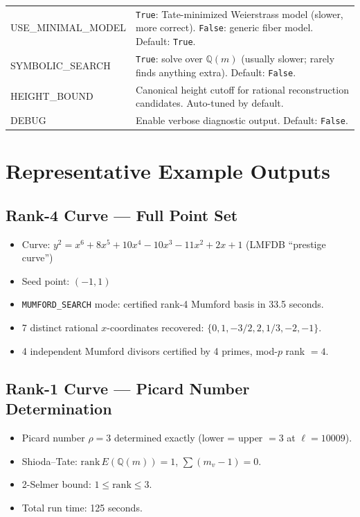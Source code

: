 \documentclass[11pt, a4paper]{article}
\begin{document}
\begin{table}[h]
\begin{tabularx}{\textwidth}{l X}
        USE\_MINIMAL\_MODEL & \texttt{True}: Tate-minimized Weierstrass model (slower, more correct). \texttt{False}: generic fiber model. Default: \texttt{True}. \\
        SYMBOLIC\_SEARCH & \texttt{True}: solve over $\mathbb{Q}(m)$ (usually slower; rarely finds anything extra). Default: \texttt{False}. \\
        HEIGHT\_BOUND & Canonical height cutoff for rational reconstruction candidates. Auto-tuned by default. \\
        DEBUG & Enable verbose diagnostic output. Default: \texttt{False}. \\
        \bottomrule
    \end{tabularx}
\end{table}

\section{Representative Example Outputs}

\subsection{Rank-4 Curve — Full Point Set}

\begin{itemize}[label={\textbullet}]
    \item Curve: $y^2 = x^6 + 8x^5 + 10x^4 - 10x^3 - 11x^2 + 2x + 1$ (LMFDB ``prestige curve'')
    \item Seed point: $(-1, 1)$
    \item \texttt{MUMFORD\_SEARCH} mode: certified rank-4 Mumford basis in 33.5 seconds.
    \item 7 distinct rational $x$-coordinates recovered: $\{0, 1, -3/2, 2, 1/3, -2, -1\}$.
    \item 4 independent Mumford divisors certified by 4 primes, mod-$p$ rank $= 4$.
\end{itemize}

\subsection{Rank-1 Curve — Picard Number Determination}

\begin{itemize}[label={\textbullet}]
    \item Picard number $\rho = 3$ determined exactly (lower = upper $= 3$ at $\ell = 10009$).
    \item Shioda--Tate: $\text{rank}\, E(\mathbb{Q}(m)) = 1$, $\sum (m_v - 1) = 0$.
    \item 2-Selmer bound: $1 \leq \text{rank} \leq 3$.
    \item Total run time: 125 seconds.
\end{itemize}
\end{document}
